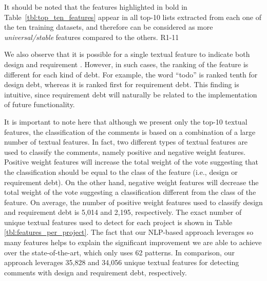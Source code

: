 {It should be noted that the features highlighted in bold in Table~\ref{tbl:top_ten_features} appear in all top-10 lists extracted from each one of the ten training datasets, and therefore can be considered as more \textit{universal/stable} features compared to the others.
}{R1-11}

We also observe that it is possible for a single textual feature to indicate both design and requirement \SATD. However, in such cases, the ranking of the feature is different for each kind of debt. For example, the word ``todo'' is ranked tenth for design debt, whereas it is ranked first for requirement debt. This finding is intuitive, since requirement debt will naturally be related to the implementation of future functionality.

It is important to note here that although we present only the top-10 textual features, the classification of the comments is based on a combination of a large number of textual features. In fact, two different types of textual features are used to classify the comments, namely positive and negative weight features. Positive weight features will increase the total weight of the vote suggesting that the classification should be equal to the class of the feature (i.e., design or requirement debt). On the other hand, negative weight features will decrease the total weight of the vote suggesting a classification different from the class of the feature. On average, the number of positive weight features used to classify design and requirement debt is 5,014 and 2,195, respectively. The exact number of unique textual features used to detect \SATD for each project is shown in Table \ref{tbl:features_per_project}. The fact that our NLP-based approach leverages so many features helps to explain the significant improvement we are able to achieve over the state-of-the-art, which only uses 62 patterns. In comparison, our approach leverages 35,828 and 34,056 unique textual features for detecting comments with design and requirement debt, respectively.

